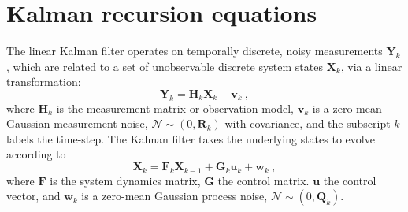 \documentclass[fleqn,usenatbib,useAMS]{mnras}
\begin{document}
\section{Kalman recursion equations} \label{sec:kalman}
The linear Kalman filter operates on temporally discrete, noisy measurements $\boldsymbol{Y}_k$, which are related to a set of unobservable discrete system states $\boldsymbol{X}_k$, via a linear transformation:
\begin{equation}
	\boldsymbol{Y}_k = \boldsymbol{H}_k \boldsymbol{X}_k + \boldsymbol{v}_k \ ,\label{eq:kalman1}
\end{equation}
where $\boldsymbol{H}_k$ is the measurement matrix or observation model, $\boldsymbol{v}_k$ is a zero-mean Gaussian measurement noise, $\mathcal{N} \sim (0,\boldsymbol{R}_k)$ with covariance, and the subscript $k$ labels the time-step. The Kalman filter takes the underlying states to evolve according to
\begin{equation}
	\boldsymbol{X}_k = \boldsymbol{F}_k \boldsymbol{X}_{k-1} + \boldsymbol{G}_k \boldsymbol{u}_k + \boldsymbol{w}_k \ , \label{eq:kalman2}
\end{equation}
where $\boldsymbol{F}$ is the system dynamics matrix, $\boldsymbol{G}$ the control matrix. $\boldsymbol{u}$ the control vector, and $\boldsymbol{w}_k$ is a zero-mean Gaussian process noise, $\mathcal{N} \sim (0,\boldsymbol{Q}_k)$. \newline 
\end{document}
